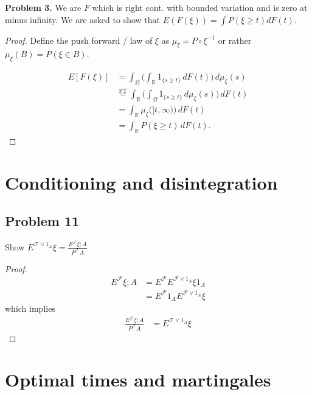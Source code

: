\documentclass[11pt]{article}
\begin{document}
\textbf{Problem 3.}
\newline
We are $F$ which is right cont. with bounded variation and is zero at minus infinity. We are asked to show that $E(F(\xi)) = \int P(\xi \geq t) dF(t)$. 
\begin{proof}
Define the push forward / law of $\xi$ as $\mu_\xi = P \circ \xi^{-1}$ or rather $\mu_\xi(B) = P(\xi \in B)$.

\begin{align}
	E[F(\xi)] &= \int_\Omega \biggl(\int_{\mathbb{R}} 1_{\{s\ge t\}} \,dF(t)\biggr)\,d\mu_\xi(s) \\
	&\overset{\text{FT}}{=} \int_{\mathbb{R}} \biggl(\int_\Omega 1_{\{s\ge t\}} \,d\mu_\xi(s)\biggr)\,dF(t) \\
	&= \int_{\mathbb{R}} \mu_\xi\bigl([t,\infty)\bigr)\,dF(t) \\
	&= \int_{\mathbb{R}} P(\xi \ge t)\,dF(t).
\end{align}
\end{proof}


\newpage 
\section*{Conditioning and disintegration}

\subsection*{Problem 11}
Show $E^{\mathcal{F} \vee 1_{A}}\xi = \frac{E^\mathcal{F}\xi;A}{P^\mathcal{F}A}$
\\
\begin{proof}
\begin{align*}
	E^\mathcal{F} \xi ; A &= E^\mathcal{F} E^{\mathcal{F} \vee 1_{A}}\xi 1_{A}\\
	&= E^\mathcal{F}1_A E^{\mathcal{F} \vee 1_{A}}\xi 
\end{align*}
which implies 
\begin{align*}
	\frac{E^\mathcal{F} \xi ; A}{P^\mathcal{F}A}&=  E^{\mathcal{F} \vee 1_{A}}\xi 
\end{align*}
\end{proof}

\newpage
\section*{Optimal times and martingales}
\end{document}
